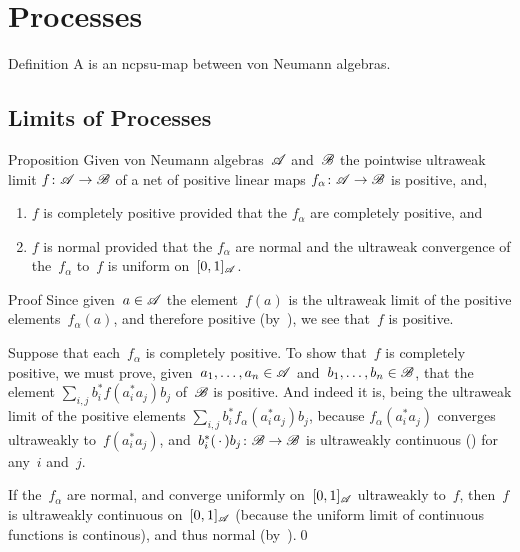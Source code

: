 \documentclass[a]{subfiles}
\begin{document}
\chapter{Processes}
\begin{parsec}%
\begin{point}{Definition}%
A  is
an ncpsu-map between von Neumann algebras.
\end{point}
\end{parsec}
\section{Limits of Processes}
\begin{parsec}%
\begin{point}{Proposition}%
Given von Neumann algebras~$\mathscr{A}$
and~$\mathscr{B}$
the pointwise ultraweak limit
$f\colon \mathscr{A}\to\mathscr{B}$
of a net of  positive linear maps $f_\alpha\colon \mathscr{A}\to\mathscr{B}$
is positive, and, 
\begin{enumerate}
\item
$f$ is completely positive provided
that the $f_\alpha$ are completely positive, and
\item
$f$ is normal provided that the $f_\alpha$ are normal
and the ultraweak convergence of the~$f_\alpha$ to~$f$
is uniform on~$[0,1]_{\mathscr{A}}$.
\end{enumerate}
\begin{point}{Proof}%
Since given~$a\in \mathscr{A}$ the element~$f(a)$
is the ultraweak limit of the positive elements~$f_\alpha(a)$,
and therefore positive (by~),
we see that~$f$ is positive.

Suppose that each~$f_\alpha$ is completely positive.
To show that~$f$ is completely positive,
we must prove, given~$a_1,\dotsc,a_n\in\mathscr{A}$
and~$b_1,\dotsc,b_n\in\mathscr{B}$,
that 
the element $\sum_{i,j} b_i^* f(a_i^*a_j)b_j$
of~$\mathscr{B}$
is positive.
And indeed it is,
being the ultraweak limit of
the positive elements $\sum_{i,j} b_i^* f_\alpha (a_i^* a_j)b_j$,
because  $f_\alpha(a_i^* a_j)$
converges ultraweakly to~$f(a_i^* a_j)$,
and~$b_i^*(\,\cdot\,)b_j\colon \mathscr{B}\to\mathscr{B}$
is ultraweakly continuous
()
for any~$i$ and~$j$.

If the~$f_\alpha$ 
are normal,
and converge uniformly on~$[0,1]_{\mathscr{A}}$ ultraweakly
to~$f$,
then~$f$ is ultraweakly continuous
on~$[0,1]_{\mathscr{A}}$
(because the uniform limit of continuous functions is continous),
and thus normal (by~).\qed
\end{point}
\end{point}
\end{parsec}
\end{document}
